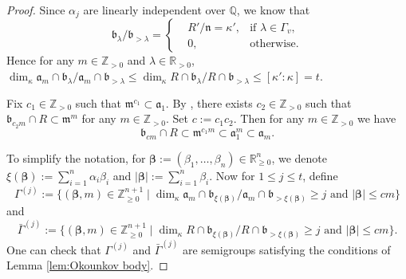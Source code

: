 \documentclass[11pt, leqno]{amsart}%
\theoremstyle{plain}
\theoremstyle{definition}
\theoremstyle{remark}
\newcommand{\bQ}{\mathbb{Q}}
\newcommand{\bR}{\mathbb{R}}
\newcommand{\bZ}{\mathbb{Z}}
\newcommand{\fa}{\mathfrak{a}}
\newcommand{\fb}{\mathfrak{b}}
\newcommand{\fm}{\mathfrak{m}}
\newcommand{\fn}{\mathfrak{n}}
\numberwithin{equation}{section}
\begin{document}
\begin{proof}
    Since $\alpha_j$ are linearly independent over $\bQ$, we know that 
    \begin{equation*}
        \fb_\lambda/\fb_{>\lambda}=\left\{\begin{aligned}
        &R'/\fn=\kappa', &\text{if } \lambda\in\Gamma_v,\\
        &0, &\text{otherwise.}
        \end{aligned}\right.
    \end{equation*}
    Hence for any $m\in\bZ_{>0}$ and $\lambda\in\bR_{>0}$, $\dim_\kappa \fa_m\cap\fb_\lambda/\fa_m\cap\fb_{>\lambda}\le \dim_\kappa R\cap\fb_\lambda/R\cap\fb_{>\lambda}\le [\kappa':\kappa]=t$.
	
    Fix $c_1\in\bZ_{>0}$ such that $\fm^{c_1}\subset\fa_1$. By \cite[Lemma 4.3]{Cut13}, there exists $c_2\in\bZ_{>0}$ such that $\fb_{c_2m}\cap R\subset \fm^m$ for any $m\in\bZ_{>0}$. Set $c:=c_1c_2$. Then for any $m\in\bZ_{>0}$ we have
    \begin{equation}\label{eqn:Izumi control}
        \fb_{cm}\cap R\subset \fm^{c_1m}\subset \fa_1^m\subset \fa_m.
    \end{equation}
	
    To simplify the notation, for $\bm\beta:=(\beta_1,\ldots,\beta_n)\in\bR_{\ge 0}^n$, we denote $\xi(\bm\beta):=\sum_{i=1}^n \alpha_i\beta_i$ and $|\bm\beta|:=\sum_{i=1}^n \beta_i$. Now for $1\le j\le t$, define
    \[
        \Gamma^{(j)}:=\{(\bm\beta,m)\in\bZ_{\ge 0}^{n+1}\mid \dim_\kappa \fa_m\cap\fb_{\xi(\bm\beta)}/\fa_m\cap\fb_{>\xi(\bm\beta)}\ge j \text{ and } |\bm\beta|\le cm\}
    \]
    and
    \[
        \bar\Gamma^{(j)}:=\{(\bm\beta,m)\in\bZ_{\ge 0}^{n+1}\mid \dim_\kappa R\cap\fb_{\xi(\bm\beta)}/R\cap\fb_{>\xi(\bm\beta)}\ge j \text{ and } |\bm\beta|\le cm\}.
    \]
    One can check that $\Gamma^{(j)}$ and $\bar\Gamma^{(j)}$ are semigroups satisfying the conditions of Lemma \ref{lem:Okounkov body}. 
	

\end{proof}
\end{document}
